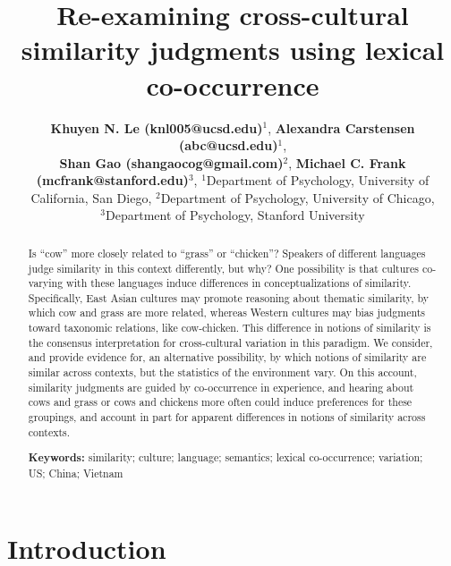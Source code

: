 \documentclass[10pt, letterpaper]{article}
\title{Re-examining cross-cultural similarity judgments using lexical
co-occurrence}
\author{{\large \bf Khuyen N. Le (knl005@ucsd.edu)}$^{1}$, {\large \bf Alexandra Carstensen (abc@ucsd.edu)}$^{1}$, \\ {\large \bf Shan Gao (shangaocog@gmail.com)$^2$}, {\large \bf Michael C. Frank (mcfrank@stanford.edu)$^3$},  \AND $^1$Department of Psychology, University of California, San Diego, $^2$Department of Psychology, University of Chicago, \\ $^3$Department of Psychology, Stanford University }
\begin{document}
\maketitle

\begin{abstract}
Is ``cow'' more closely related to ``grass'' or ``chicken''? Speakers of
different languages judge similarity in this context differently, but
why? One possibility is that cultures co-varying with these languages
induce differences in conceptualizations of similarity. Specifically,
East Asian cultures may promote reasoning about thematic similarity, by
which cow and grass are more related, whereas Western cultures may bias
judgments toward taxonomic relations, like cow-chicken. This difference
in notions of similarity is the consensus interpretation for
cross-cultural variation in this paradigm. We consider, and provide
evidence for, an alternative possibility, by which notions of similarity
are similar across contexts, but the statistics of the environment vary.
On this account, similarity judgments are guided by co-occurrence in
experience, and hearing about cows and grass or cows and chickens more
often could induce preferences for these groupings, and account in part
for apparent differences in notions of similarity across contexts.

\textbf{Keywords:}
similarity; culture; language; semantics; lexical co-occurrence;
variation; US; China; Vietnam
\end{abstract}

\hypertarget{introduction}{%
\section{Introduction}\label{introduction}}
\end{document}
